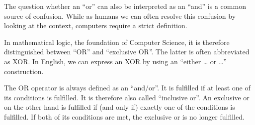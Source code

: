 
The question whether an ``or'' can also be interpreted as an ``and'' is a common source of confusion. While as humans we can often resolve this confusion by looking at the context, computers require a strict definition.

In mathematical logic, the foundation of Computer Science, it is therefore distinguished between ``OR'' and ``exclusive OR''. The latter is often abbreviated as XOR. In English, we can express an XOR by using an ``either \ldots{} or \ldots{}'' construction.

The OR operator is always defined as an ``and/or''. It is fulfilled if at least one of its conditions is fulfilled. It is therefore also called ``inclusive or''. An exclusive or on the other hand is fulfilled if (and only if) exactly one of the conditions is fulfilled. If both of its conditions are met, the exclusive or is no longer fulfilled.


